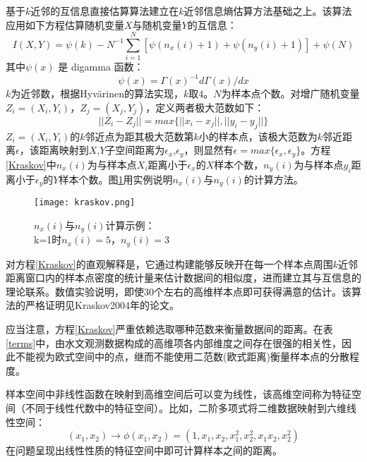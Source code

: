 基于$k$近邻的互信息直接估算算法建立在$k$近邻信息熵估算方法\cite{leonenko}基础之上。该算法应用如下方程估算随机变量$X$与随机变量$Y$的互信息：
\begin{equation}\label{Kraskov}
I(X,Y)=\psi(k)-N^{-1}\sum_{i=1}^{N}[\psi(n_x(i)+1)+\psi
(n_y(i)+1)]+\psi(N)
\end{equation}
其中$\psi(x)$ 是 digamma 函数：
\begin{equation}
  \psi(x)=\Gamma(x)^{-1}d\Gamma(x)/dx
\end{equation}  
$k$为近邻数，根据Hyv{\"a}rinen的算法实现，$k$取$4$。$N$为样本点个数。对增广随机变量$Z_i=(X_i,Y_i)$，$Z_j=(X_j,Y_j)$，定义两者极大范数如下：
\begin{equation}
||Z_i-Z_j||=max\{||x_i-x_j|| ,||y_i-y_j||\}
\end{equation}
$Z_i=(X_i,Y_i)$的$k$邻近点为距其极大范数第$k$小的样本点，该极大范数为$k$邻近距离$\epsilon$，该距离映射到$X$,$Y$子空间距离为$\epsilon _x$,$\epsilon _y$，则显然有$\epsilon=max\{\epsilon _x,\epsilon _y\}$。方程\ref{Kraskov}中$n_x(i)$为与样本点$X_i$距离小于$\epsilon _x$的$X$样本个数，$n_y(i)$为与样本点$y_i$距离小于$\epsilon _y$的$Y$样本个数。图\ref{kras}用实例说明$n_x(i)$与$n_y(i)$的计算方法。
\begin{figure}[H]
\centering
\texttt{[image: kraskov.png]}
\caption{$n_x(i)$与$n_y(i)$计算示例\cite{kraskov2004estimating}：\\k=1时$n_x(i)=5$，$n_y(i)=3$}%
\label{kras}
\end{figure}

对方程\ref{Kraskov}的直观解释是，它通过构建能够反映开在每一个样本点周围$k$近邻距离窗口内的样本点密度的统计量来估计数据间的相似度，进而建立其与互信息的理论联系。数值实验说明，即使$30$个左右的高维样本点即可获得满意的估计。该算法的严格证明见Kraskov2004年的论文\cite{kraskov2004estimating}。

应当注意，方程\ref{Kraskov}严重依赖选取哪种范数来衡量数据间的距离。在表\ref{terms}中，由水文观测数据构成的高维项各内部维度之间存在很强的相关性，因此不能视为欧式空间中的点，继而不能使用二范数(欧式距离)衡量样本点的分散程度。

样本空间中非线性函数在映射到高维空间后可以变为线性，该高维空间称为特征空间（不同于线性代数中的特征空间）。比如，二阶多项式将二维数据映射到六维线性空间：
\begin{equation}
(x_1,x_2) \to \phi(x_1,x_2)=(1,x_1,x_2,x_1^2,x_2^2,x_1x_2,x_2^2)
\end{equation}
在问题呈现出线性性质的特征空间中即可计算样本之间的距离。

